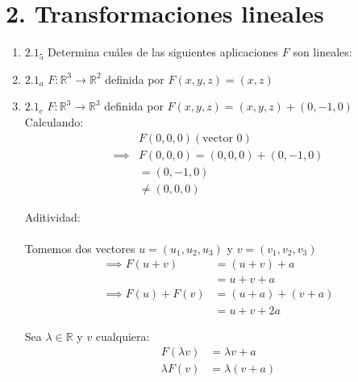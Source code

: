 \documentclass{article}
\begin{document}
		\section*{2. Transformaciones lineales}
		
		\begin{enumerate}
			
			
			\item[] \(2.1_5\) 
			Determina cuáles de las siguientes aplicaciones \(F\) son lineales:
			
			
			\item \(2.1_a\) 
			\(F: \mathbb{R}^3 \to \mathbb{R}^2\) definida por \(F(x,y,z)=(x,z)\)
			
			
			\item \(2.1_c\) 
			\(F: \mathbb{R}^3 \to \mathbb{R}^3\) definida por \(F(x,y,z)=(x,y,z)+(0,-1,0)\)\\
			
			Calculando:
			\begin{equation*}
				\begin{aligned}
					&F(0,0,0)  (\text{vector }0)\\
					\implies & F(0,0,0) =(0,0,0)+(0,-1,0)\\
					&\text{} = (0,-1,0)\\	
					&\text{} \neq (0,0,0)
				\end{aligned}
			\end{equation*}
			
			Aditividad:\\
			\\Tomemos dos vectores \(u=(u_1,u_2,u_3)\) y \(v=(v_1,v_2,v_3)\)
			\begin{equation*}
				\begin{aligned}
					\implies F(u+v) &=(u+v)+a\\
					&=u+v+a\\
					\implies F(u)+F(v) &=(u+a)+(v+a)\\
					&=u+v+2a
				\end{aligned}
			\end{equation*}
			
			Sea \(\lambda \in \mathbb{R}\) y \(v\) cualquiera: 
			\begin{equation*}
				\begin{aligned}
					F(\lambda v) &= \lambda v+a\\
					\lambda F(v) &= \lambda (v+a)
				\end{aligned}
			\end{equation*}
			

\end{enumerate}
\end{document}
